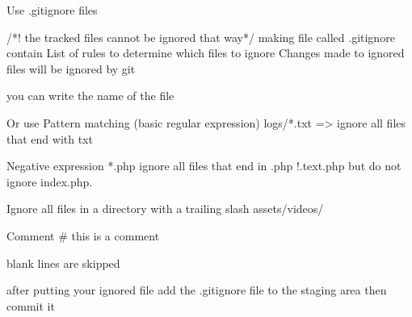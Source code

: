 Use .gitignore files 

/*! the tracked files cannot be ignored that way*/
making file called  .gitignore 
contain List of rules to determine which files to ignore 
Changes made to ignored files will be ignored by git 

you can write the name of the file 

Or use Pattern matching (basic regular expression)
  logs/*.txt   => ignore all files that end with txt

Negative expression 
  *.php      ignore all files that end in .php
  !.text.php  but do not ignore index.php.

Ignore all files in a directory with a trailing slash 
  assets/videos/ 

Comment 
  # this is a comment 

blank lines are skipped

after putting your ignored file 
  add the .gitignore file to the staging area 
  then commit it 


